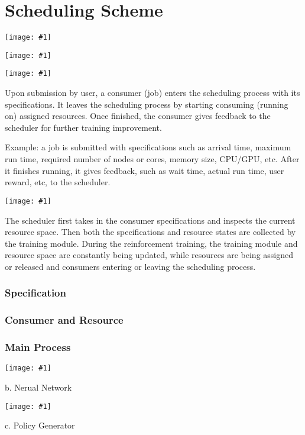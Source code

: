 \documentclass{article}
\theoremstyle{definition}
\theoremstyle{remark}
\newcommand{\addpic}[1]{\texttt{[image: \#1]}}
\begin{document}
	\newpage
	
	\part{Scheduling Scheme}
	
	\addpic{figures/Intro-General.jpg}

	
	\addpic{figures/all-process.jpg}
	
	\addpic{figures/Macro-graph.png} 
	
	
	Upon submission by user, a consumer (job) enters the scheduling process with its specifications. It leaves the scheduling process by starting consuming (running on) assigned resources. Once finished, the consumer gives feedback to the scheduler for further training improvement.
	
	Example: a job is submitted with specifications such as arrival time, maximum run time, required number of nodes or cores, memory size, CPU/GPU, etc. After it finishes running, it gives feedback, such as wait time, actual run time, user reward, etc, to the scheduler.
	
	\addpic{figures/Intro-Scheduler.jpg}
	
	The scheduler first takes in the consumer specifications and inspects the current resource space. Then both the specifications and resource states are collected by the training module. During the reinforcement training, the training module and resource space are constantly being updated, while resources are being assigned or released and consumers entering or leaving the scheduling process.
	

	\section{Specification}
	
	\section{Consumer and Resource}
	
	\section{Main Process}

	\addpic{figures/Training-Main-Process.jpg}

	
	b. Nerual Network


	\addpic{figures/Neural-Network.jpeg}
	
	c. Policy Generator
	
\end{document}
